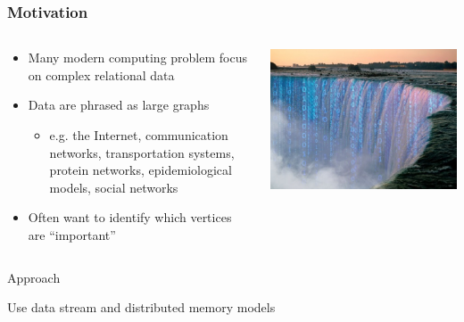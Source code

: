 \documentclass{beamer}
\begin{document}
\begin{frame}
\frametitle{Motivation}


\begin{columns}
	\begin{column}{0.55\textwidth}
		\begin{itemize}
			\item Many modern computing problem focus on complex relational data
			\item Data are phrased as large graphs
			\begin{itemize}
				\item e.g. the Internet, communication networks, transportation systems, protein networks, epidemiological models, social networks
			\end{itemize}
			\item Often want to identify which vertices are ``important''
		\end{itemize}
	\end{column}
	\begin{column}{0.45\textwidth}  %
		\begin{center}
			\includegraphics[width=1.0\textwidth]{bigdata}
		\end{center}
	\end{column}
\end{columns}

\begin{block}{\centering Approach}
	\begin{center}
		Use data stream and distributed memory models
	\end{center}
\end{block}

\end{frame}
\end{document}
